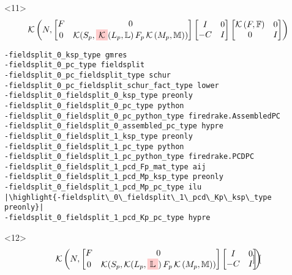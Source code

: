 \documentclass[presentation]{beamer}
\newcommand{\KSP}[2]{\ensuremath{\mathcal{K}\left(#1, \mathbb{#2}\right)}}
\newcommand{\ksp}[1]{\KSP{#1}{#1}}
\newcommand{\highlight}[1]{\colorbox{red!20}{\color{black} #1}}
\begin{document}
\begin{frame}[fragile]
\begin{onlyenv}
\begin{verbatim}
\end{verbatim}
  \end{onlyenv}
  \begin{onlyenv}<11>
    \color{gray}
    \begin{equation*}
      \KSP{N}{%
        \begin{bmatrix}
        F & 0 \\
        0 & \mathcal{K}(S_p, \highlight{$\mathcal{K}$}(L_p, \mathbb{L})\,F_p \, \KSP{M_p}{M})
      \end{bmatrix}
      \begin{bmatrix}
        I & 0\\
        -C & I
      \end{bmatrix}
      \begin{bmatrix}
        \ksp{F} & 0 \\
        0 & I
      \end{bmatrix}}
    \end{equation*}
\begin{verbatim}
-fieldsplit_0_ksp_type gmres
-fieldsplit_0_pc_type fieldsplit
-fieldsplit_0_pc_fieldsplit_type schur
-fieldsplit_0_pc_fieldsplit_schur_fact_type lower
-fieldsplit_0_fieldsplit_0_ksp_type preonly
-fieldsplit_0_fieldsplit_0_pc_type python
-fieldsplit_0_fieldsplit_0_pc_python_type firedrake.AssembledPC
-fieldsplit_0_fieldsplit_0_assembled_pc_type hypre
-fieldsplit_0_fieldsplit_1_ksp_type preonly
-fieldsplit_0_fieldsplit_1_pc_type python
-fieldsplit_0_fieldsplit_1_pc_python_type firedrake.PCDPC
-fieldsplit_0_fieldsplit_1_pcd_Fp_mat_type aij
-fieldsplit_0_fieldsplit_1_pcd_Mp_ksp_type preonly
-fieldsplit_0_fieldsplit_1_pcd_Mp_pc_type ilu
|\highlight{-fieldsplit\_0\_fieldsplit\_1\_pcd\_Kp\_ksp\_type preonly}|
-fieldsplit_0_fieldsplit_1_pcd_Kp_pc_type hypre
\end{verbatim}
  \end{onlyenv}
  \begin{onlyenv}<12>
    \color{gray}
    \begin{equation*}
      \KSP{N}{%
        \begin{bmatrix}
        F & 0 \\
        0 & \mathcal{K}(S_p, \mathcal{K}(L_p, \highlight{$\mathbb{L}$})\,F_p \, \KSP{M_p}{M})
      \end{bmatrix}
      \begin{bmatrix}
        I & 0\\
        -C & I
      \end{bmatrix}
      \begin{bmatrix}

\end{bmatrix}}
\end{equation*}
\end{onlyenv}
\end{frame}
\end{document}
